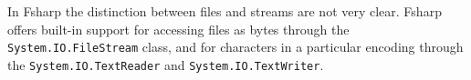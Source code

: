 \begin{comment}
\begin{table}
\begin{center}
  \begin{tabularx}{\linewidth}{|l|X|}
    \hline
    \lstinline{FileShare.} & Description\\
    \hline
    \lstinline{Delete} &  Other programs may delete the file.\\
    \hline
    \lstinline{Inheritable} & Makes the file handle inheritable by child processes.\\
    \hline
    \lstinline{None} & Other programs may not access the file.\\
    \hline
    \lstinline{Read} & Other programs may open and read the file.\\
    \hline
    \lstinline{ReadWrite} & Other programs may read from and write to the file.\\
    \hline
    \lstinline{Write} & Other programs may write to the file.\\
    \hline
  \end{tabularx}
\end{center}
\end{table}
\end{comment}

In Fsharp the distinction between files and streams are not very clear. Fsharp offers built-in support for accessing files as bytes through the \lstinline!System.IO.FileStream! class, and for characters in a particular encoding through the \lstinline!System.IO.TextReader! and \lstinline!System.IO.TextWriter!.

